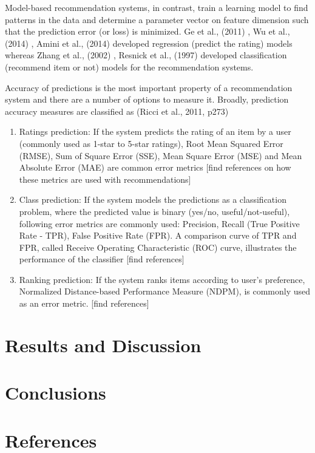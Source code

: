 \documentclass[12pt]{article}
\begin{document}
Model-based recommendation systems, in contrast, train a learning model to find patterns in the data and determine a parameter vector on feature dimension such that the prediction error (or loss) is minimized. Ge et al., (2011) \cite{ge}, Wu et al., (2014) \cite{wu}, Amini et al., (2014) \cite{amini} developed regression (predict the rating) models whereas Zhang et al., (2002) \cite{zhang-iyengar}, Resnick et al., (1997) \cite{resnick} developed classification (recommend item or not) models for the recommendation systems.

Accuracy of predictions is the most important property of a recommendation system and there are a number of options to measure it. Broadly, prediction accuracy measures are classified as (Ricci et al., 2011, p273) \cite{ricci}

\begin{enumerate}
	\item Ratings prediction: If the system predicts the rating of an item by a user (commonly used as 1-star to 5-star ratings), Root Mean Squared Error (RMSE), Sum of Square Error (SSE), Mean Square Error (MSE) and Mean Absolute Error (MAE) are common error metrics [find references on how these metrics are used with recommendations]
	\item Class prediction: If the system models the predictions as a classification problem, where the predicted value is binary (yes/no, useful/not-useful), following error metrics are commonly used: Precision, Recall (True Positive Rate - TPR), False Positive Rate (FPR). A comparison curve of TPR and FPR, called Receive Operating Characteristic (ROC) curve, illustrates the performance of the classifier [find references]
	\item Ranking prediction: If the system ranks items according to user's preference, Normalized Distance-based Performance Measure (NDPM), is commonly used as an error metric. [find references]
\end{enumerate}

\newpage\section{Results and Discussion}

\newpage\section{Conclusions}

\newpage\section{References}
\end{document}
